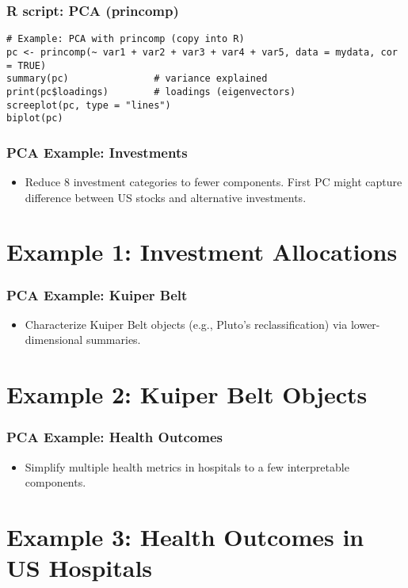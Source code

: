 \documentclass{beamer}
\begin{document}
\begin{frame}[fragile]
    \frametitle{R script: PCA (princomp)}
    \begin{verbatim}
# Example: PCA with princomp (copy into R)
pc <- princomp(~ var1 + var2 + var3 + var4 + var5, data = mydata, cor = TRUE)
summary(pc)               # variance explained
print(pc$loadings)        # loadings (eigenvectors)
screeplot(pc, type = "lines")
biplot(pc)
    \end{verbatim}
\end{frame}

\begin{frame}
    \frametitle{PCA Example: Investments}
    \begin{itemize}
        \item Reduce 8 investment categories to fewer components. First PC might capture difference between US stocks and alternative investments.
    \end{itemize}
\end{frame}

\section{Example 1: Investment Allocations}

\begin{frame}
    \frametitle{PCA Example: Kuiper Belt}
    \begin{itemize}
        \item Characterize Kuiper Belt objects (e.g., Pluto's reclassification) via lower-dimensional summaries.
    \end{itemize}
\end{frame}

\section{Example 2: Kuiper Belt Objects}

\begin{frame}
    \frametitle{PCA Example: Health Outcomes}
    \begin{itemize}
        \item Simplify multiple health metrics in hospitals to a few interpretable components.
    \end{itemize}
\end{frame}

\section{Example 3: Health Outcomes in US Hospitals}
\end{document}
